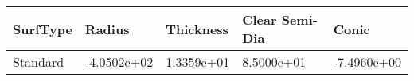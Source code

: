 \documentclass[convert={convertexe={magick.exe}}]{standalone}
\begin{document}
\begin{tabular}{lllll}
\toprule
SurfType &      Radius &  Thickness &  Clear Semi-Dia &       Conic \\
\midrule
Standard & -4.0502e+02 & 1.3359e+01 &      8.5000e+01 & -7.4960e+00 \\
\bottomrule
\end{tabular}
\end{document}
